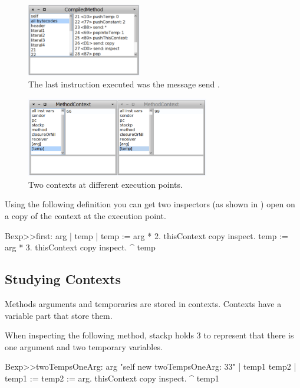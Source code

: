 \documentclass[a4paper,10pt,twoside]{book}
\begin{document}
\begin{figure}[!h]
\begin{center}\includegraphics[width=5cm]{ByteCodes}
\caption{The last instruction executed was the message send .\label{ByteCodes}}
\end{center}
\end{figure}




\begin{figure}[!h]
\begin{center}\includegraphics[width=8cm]{TwoContexts}
\caption{Two contexts at different execution points.}
\end{center}
\end{figure}

Using the following definition you can get two inspectors (as shown in ) open on a copy of the context
at the execution point.
\begin{code}
Bexp>>first: arg
	| temp |
	temp := arg * 2.
	thisContext copy inspect.
	temp := arg * 3.
	thisContext copy inspect.
	^ temp
\end{code}

\subsection{Studying Contexts}
Methods arguments and temporaries are stored in contexts. Contexts have a variable part that
store them.

When inspecting the following method, stackp holds 3 to represent that there is one argument
and two temporary variables.

\begin{code}{}
Bexp>>twoTempsOneArg: arg
	"self new twoTempsOneArg: 33"
	| temp1 temp2 |
	temp1 := temp2 := arg.
	thisContext copy inspect.
	^ temp1
\end{code}
\end{document}
